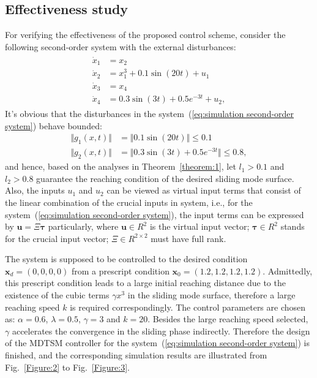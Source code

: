 \documentclass[3p]{elsarticle}
\theoremstyle{plain}
\theoremstyle{remark}
\begin{document}
\subsection{Effectiveness study}
For verifying the effectiveness of the proposed control scheme, consider the following second-order system with the external disturbances:
\begin{align}
\begin{split}
\dot x_1 &= x_2\\
\dot x_2 &= x_1^3+0.1\sin(20t)+u_1\\
\dot x_3 &= x_4\\
\dot x_4 &= 0.3\sin(3t)+0.5e^{-3t}+u_2,\label{eq:simulation second-order system}
\end{split}
\end{align}
It's obvious that the disturbances in the system~(\ref{eq:simulation second-order system}) behave bounded:
\begin{align*}
\Vert g_1(x,t)\Vert &= \Vert 0.1\sin(20t)\Vert\le 0.1\\
\Vert g_2(x,t)\Vert &= \Vert 0.3\sin(3t)+0.5e^{-3t}\Vert\le 0.8,
\end{align*}
and hence, based on the analyses in Theorem~\ref{theorem:1}, let $l_1>0.1$ and $l_2>0.8$ guarantee the reaching condition of the desired sliding mode  surface. Also, the inputs $u_1$ and $u_2$ can be viewed as virtual input terms that consist of the linear combination of the crucial inputs in system, i.e., for the system~(\ref{eq:simulation second-order system}), the input terms can be expressed by $\bm u = \Xi\bm\tau$ particularly, where $\bm u\in R^2$ is the virtual input vector; $\bm \tau\in R^2$ stands for the crucial input vector; $\Xi\in R^{2\times 2}$ must have full rank.\par
The system is supposed to be controlled to the desired condition $\bm x_d=(0,0,0,0)$ from a prescript condition $\bm x_0=(1.2,1.2,1.2,1.2)$. Admittedly, this prescript condition leads to a large initial reaching distance due to the existence of the cubic terms $\gamma x^3$ in the sliding mode  surface, therefore a large reaching speed $k$ is required correspondingly. The control parameters are chosen as: $\alpha = 0.6$, $\lambda = 0.5$, $\gamma = 3$ and $k = 20$. Besides the large reaching speed selected, $\gamma$ accelerates the convergence in the sliding phase indirectly. Therefore the design of the MDTSM controller for the system~(\ref{eq:simulation second-order system}) is finished, and the corresponding simulation results are illustrated from Fig.~\ref{Figure:2} to Fig.~\ref{Figure:3}.
\end{document}
